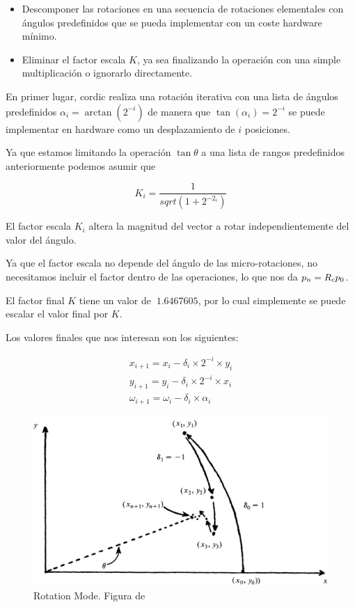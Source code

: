 \begin{itemize}
	\item Descomponer las rotaciones en una secuencia de rotaciones elementales con ángulos predefinidos que se pueda implementar con un coste hardware mínimo.
	\item Eliminar el factor escala $K$, ya sea finalizando la operación con una simple multiplicación o ignorarlo directamente.
\end{itemize}

En primer lugar, \gls{cordic} realiza una rotación iterativa con una lista de ángulos predefinidos $\alpha_{i} = \arctan({2^{-i}})$ de manera que $\tan({\alpha_{i}}) = 2^{-i}$ se puede implementar en hardware como un desplazamiento de $i$ posiciones.

Ya que estamos limitando la operación $\tan{\theta}$ a una lista de rangos predefinidos anteriormente podemos asumir que

\[
	K_{i} = \frac{1}{sqrt{(1+2^{-2_{i}})}}
\]

El factor escala $K_{i}$ altera la magnitud del vector a rotar independientemente del valor del ángulo. 

Ya que el factor escala no depende del ángulo de las micro-rotaciones, no necesitamos incluir el factor dentro de las operaciones, lo que nos da $\boldmath{p_{n} = R_{c}p_{0}}$.

El factor final $K$ tiene un valor de $~1.6467605$, por lo cual simplemente se puede escalar el valor final por $K$.

Los valores finales que nos interesan son los siguientes:

\[
\begin{matrix}
	x_{i+1} = x_{i} - \delta_{i} \times 2^{-i} \times y_{i} \\
	y_{i+1} = y_{i} - \delta_{i} \times 2^{-i} \times x_{i} \\
	\omega_{i+1} =  \omega_{i} - \delta_{i} \times \alpha_{i}
\end{matrix}
\]

\begin{figure}[ht]
	\centering
	\includegraphics[width=\textwidth]{archivos/CORDIC/RotationMode.png}
	\caption{Rotation Mode. Figura de \cite{schelin_calculator_1983}}
	\label{graf:RM}
\end{figure}

